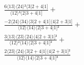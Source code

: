 \documentclass[varwidth, border=5pt]{standalone}
\begin{document}
\begin{my}
$\begin{gathered}
\scriptscriptstyle\frac{6⟨13⟩⟨24⟩²⟨3|2+4|1]}{⟨12⟩³⟨2|3+4|1]} +\\
\scriptscriptstyle\frac{-2⟨24⟩⟨34⟩⟨3|2+4|1]⟨4|2+3|1]}{⟨12⟩⟨14⟩⟨2|3+4|1]²} +\\
\scriptscriptstyle\frac{3⟨13⟩⟨23⟩⟨24⟩⟨4|2+3|1]²}{⟨12⟩²⟨14⟩⟨2|3+4|1]²} +\\
\scriptscriptstyle\frac{2⟨23⟩⟨24⟩⟨3|2+4|1]⟨4|2+3|1]²}{⟨12⟩⟨14⟩⟨2|3+4|1]³} \phantom{+}
\end{gathered}$
\end{my}
\end{document}
